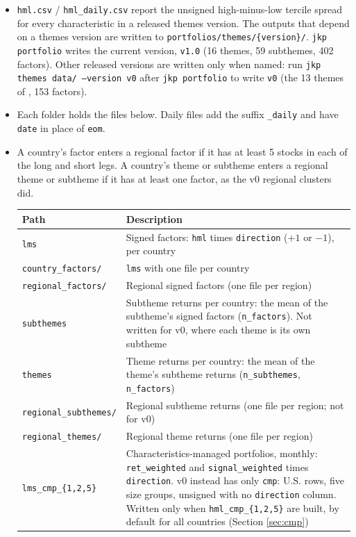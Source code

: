 \documentclass[12pt,title,fleqn]{article}
\begin{document}
\begin{itemize}
  \item \texttt{hml.csv} / \texttt{hml\_daily.csv} report the unsigned high-minus-low tercile spread for every characteristic in a released themes version. The outputs that depend on a themes version are written to \texttt{portfolios/themes/\{version\}/}. \texttt{jkp portfolio} writes the current version, \texttt{v1.0} (16 themes, 59 subthemes, 402 factors). Other released versions are written only when named: run \texttt{jkp themes data/ --version v0} after \texttt{jkp portfolio} to write \texttt{v0} (the 13 themes of \cite{JensenKellyPedersen2023}, 153 factors).
  \item Each folder holds the files below. Daily files add the suffix \texttt{\_daily} and have \texttt{date} in place of \texttt{eom}.
  \item A country's factor enters a regional factor if it has at least 5 stocks in each of the long and short legs. A country's theme or subtheme enters a regional theme or subtheme if it has at least one factor, as the v0 regional clusters did.

  \begin{center}
  \begin{tabular}{|l|p{10cm}|}
  \hline
  \textbf{Path} & \textbf{Description} \\
  \hline
  \texttt{lms} & Signed factors: \texttt{hml} times \texttt{direction} ($+1$ or $-1$), per country \\
  \texttt{country\_factors/} & \texttt{lms} with one file per country \\
  \texttt{regional\_factors/} & Regional signed factors (one file per region) \\
  \texttt{subthemes} & Subtheme returns per country: the mean of the subtheme's signed factors (\texttt{n\_factors}). Not written for v0, where each theme is its own subtheme \\
  \texttt{themes} & Theme returns per country: the mean of the theme's subtheme returns (\texttt{n\_subthemes}, \texttt{n\_factors}) \\
  \texttt{regional\_subthemes/} & Regional subtheme returns (one file per region; not for v0) \\
  \texttt{regional\_themes/} & Regional theme returns (one file per region) \\
  \texttt{lms\_cmp\_\{1,2,5\}} & Characteristics-managed portfolios, monthly: \texttt{ret\_weighted} and \texttt{signal\_weighted} times \texttt{direction}. v0 instead has only \texttt{cmp}: U.S. rows, five size groups, unsigned with no \texttt{direction} column. Written only when \texttt{hml\_cmp\_\{1,2,5\}} are built, by default for all countries (Section \ref{sec:cmp}) \\
  \hline
  \end{tabular}
  \end{center}


\end{itemize}
\end{document}
